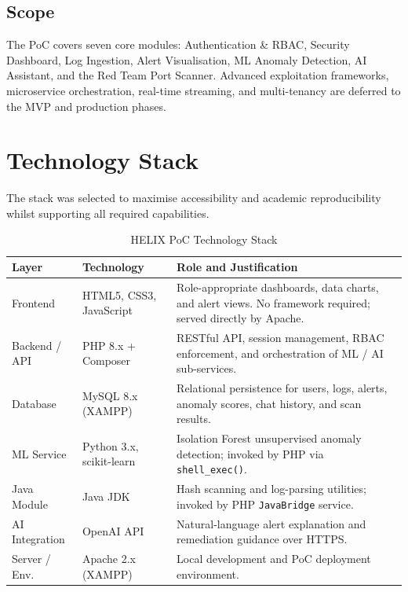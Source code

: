 \documentclass[12pt,a4paper]{article}
\begin{document}
\subsection{Scope}
The PoC covers seven core modules: Authentication \& RBAC, Security Dashboard,
Log Ingestion, Alert Visualisation, ML Anomaly Detection, AI Assistant, and the
Red Team Port Scanner. Advanced exploitation frameworks, microservice orchestration,
real-time streaming, and multi-tenancy are deferred to the MVP and production phases.

\section{Technology Stack}

The stack was selected to maximise accessibility and academic reproducibility whilst
supporting all required capabilities.

\begin{table}[H]
  \centering
  \renewcommand{\arraystretch}{1.3}
  \begin{tabular}{@{}L{2.8cm} L{3.4cm} p{7.5cm}@{}}
    \toprule
    \textbf{Layer} & \textbf{Technology} & \textbf{Role and Justification} \\
    \midrule
    Frontend
      & HTML5, CSS3, JavaScript
      & Role-appropriate dashboards, data charts, and alert views.
        No framework required; served directly by Apache. \\
    Backend / API
      & PHP 8.x + Composer
      & RESTful API, session management, RBAC enforcement,
        and orchestration of ML / AI sub-services. \\
    Database
      & MySQL 8.x (XAMPP)
      & Relational persistence for users, logs, alerts,
        anomaly scores, chat history, and scan results. \\
    ML Service
      & Python 3.x, scikit-learn
      & Isolation Forest unsupervised anomaly detection;
        invoked by PHP via \texttt{shell\_exec()}. \\
    Java Module
      & Java JDK
      & Hash scanning and log-parsing utilities;
        invoked by PHP \texttt{JavaBridge} service. \\
    AI Integration
      & OpenAI API
      & Natural-language alert explanation and
        remediation guidance over HTTPS. \\
    Server / Env.
      & Apache 2.x (XAMPP)
      & Local development and PoC deployment environment. \\
    \bottomrule
  \end{tabular}
  \caption{HELIX PoC Technology Stack}
\end{table}
\end{document}
